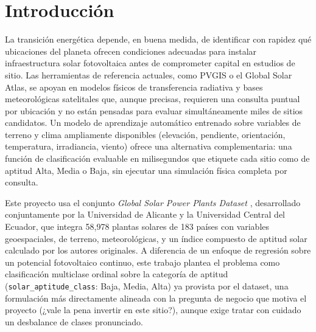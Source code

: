 \documentclass[pdflatex,sn-mathphys-num]{sn-jnl}
\begin{document}

\maketitle

\section{Introducción}\label{sec:intro}

La transición energética depende, en buena medida, de identificar con rapidez qué ubicaciones del planeta ofrecen condiciones adecuadas para instalar infraestructura solar fotovoltaica antes de comprometer capital en estudios de sitio. Las herramientas de referencia actuales, como PVGIS o el Global Solar Atlas, se apoyan en modelos físicos de transferencia radiativa y bases meteorológicas satelitales que, aunque precisas, requieren una consulta puntual por ubicación y no están pensadas para evaluar simultáneamente miles de sitios candidatos. Un modelo de aprendizaje automático entrenado sobre variables de terreno y clima ampliamente disponibles (elevación, pendiente, orientación, temperatura, irradiancia, viento) ofrece una alternativa complementaria: una función de clasificación evaluable en milisegundos que etiquete cada sitio como de aptitud Alta, Media o Baja, sin ejecutar una simulación física completa por consulta.

Este proyecto usa el conjunto \textit{Global Solar Power Plants Dataset} \cite{bib1}, desarrollado conjuntamente por la Universidad de Alicante y la Universidad Central del Ecuador, que integra 58{,}978 plantas solares de 183 países con variables geoespaciales, de terreno, meteorológicas, y un índice compuesto de aptitud solar calculado por los autores originales. A diferencia de un enfoque de regresión sobre un potencial fotovoltaico continuo, este trabajo plantea el problema como clasificación multiclase ordinal sobre la categoría de aptitud (\texttt{solar\_aptitude\_class}: Baja, Media, Alta) ya provista por el dataset, una formulación más directamente alineada con la pregunta de negocio que motiva el proyecto (¿vale la pena invertir en este sitio?), aunque exige tratar con cuidado un desbalance de clases pronunciado.
\end{document}
